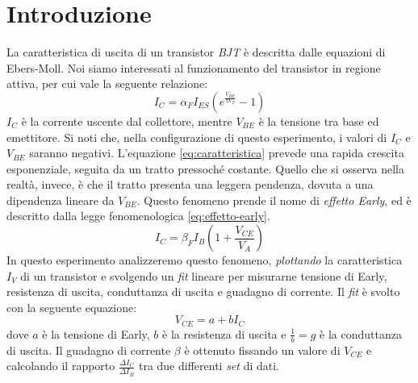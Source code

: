 \section{Introduzione}\label{sec:scopo}
La caratteristica di uscita di un transistor \emph{BJT} è descritta dalle
equazioni di Ebers-Moll. Noi siamo interessati al funzionamento del transistor in
regione attiva, per cui vale la seguente relazione:
\begin{equation}
  I_C = \alpha_F I_{ES} (e^{\frac{V_{BE}}{\eta V_T}} - 1)
  \label{eq:caratteristica}
\end{equation}
$I_C$ è la corrente uscente dal collettore, mentre $V_{BE}$ è la tensione tra base
ed emettitore. Si noti che, nella configurazione di questo esperimento, i valori di $I_C$
e $V_{BE}$ saranno negativi.
L'equazione \eqref{eq:caratteristica} prevede una rapida crescita esponenziale,
seguita da un tratto pressoché costante. Quello che si osserva nella realtà, invece, è che
il tratto presenta una leggera pendenza, dovuta a una dipendenza lineare da $V_{BE}$.
Questo fenomeno prende il nome di \emph{effetto Early}, ed è descritto dalla legge fenomenologica \eqref{eq:effetto-early}.
\begin{equation}
  I_C = \beta_F I_B \left( 1+ \frac {V_{CE}} {V_A} \right)
  \label{eq:effetto-early}
\end{equation}
In questo esperimento analizzeremo questo fenomeno, \emph{plottando} la caratteristica $I_V$
di un transistor e svolgendo un \emph{fit} lineare per misurarne tensione di Early,
resistenza di uscita, conduttanza di uscita e guadagno di corrente. Il \emph{fit} è svolto
con la seguente equazione:
\begin{equation}
  V_{CE} = a + b I_C
  \label{eq:fit}
\end{equation}
dove $a$ è la tensione di Early, $b$ è la resistenza di uscita e $\frac 1 b = g$ è la
conduttanza di uscita. Il guadagno di corrente $\beta$ è ottenuto fissando un valore
di $V_{CE}$ e calcolando il rapporto $\frac {\Delta I_C} {\Delta I_B}$ tra due differenti \emph{set}
di dati.
